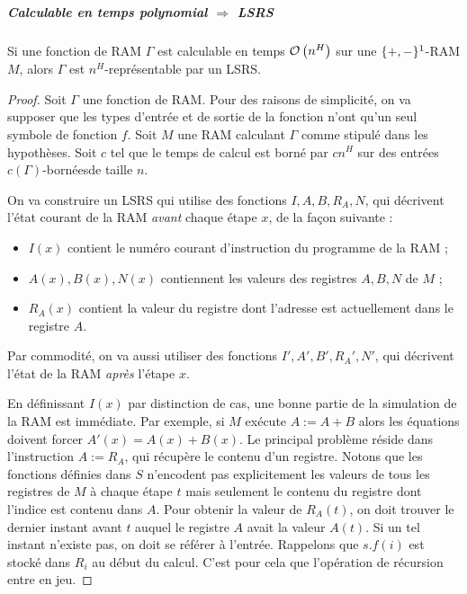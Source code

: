 \documentclass{article}
\begin{document}
		\pagebreak
		
	\subparagraph{Calculable en temps polynomial $\Rightarrow$ LSRS}
		
		
		\begin{conj}
			Si une fonction de RAM $\Gamma$ est calculable en temps $\mathcal{O}\left( n^H  \right)$ sur une $\{+, -\} \footnotemark$-RAM $M$, alors $\Gamma$ est $n^H$-représentable par un LSRS.
		
		\end{conj}
		
		\begin{proof}
			Soit $\Gamma$ une fonction de RAM. Pour des raisons de simplicité, on va supposer que les types d'entrée et de sortie de la fonction n'ont qu'un seul symbole de fonction $f$. Soit $M$ une RAM calculant $\Gamma$ comme stipulé dans les hypothèses. Soit $c$ tel que le temps de calcul est borné par $c n^H$ sur des entrées $c(\Gamma)$-bornées\footnotemark de taille $n$.
			
				
			On va construire un LSRS qui utilise des fonctions $I, A, B, R_A, N$, qui décrivent l'état courant de la RAM \emph{avant} chaque étape $x$, de la façon suivante :
			
			\begin{itemize}[itemsep=-1mm]
				\item	$I(x)$ contient le numéro courant d'instruction du programme de la RAM ;
				\item 	$A(x), B(x), N(x)$ contiennent les valeurs des registres $A, B, N$ de $M$ ;
				\item 	$R_A(x)$ contient la valeur du registre dont l'adresse est actuellement dans le registre $A$.
			\end{itemize}
			
			Par commodité, on va aussi utiliser des fonctions $I', A', B', R_A', N'$, qui décrivent l'état de la RAM \emph{après} l'étape $x$. 
			
			En définissant $I(x)$ par distinction de cas, une bonne partie de la simulation de la RAM est immédiate. Par exemple, si $M$ exécute $A:= A + B$ alors les équations doivent forcer $A'(x) = A(x) + B(x)$. Le principal problème réside dans l'instruction $A:= R_A$, qui récupère le contenu d'un registre. Notons que les fonctions définies dans $S$ n'encodent pas explicitement les valeurs de tous les registres de $M$ à chaque étape $t$ mais seulement le contenu du registre dont l'indice est contenu dans $A$. Pour obtenir la valeur de $R_A(t)$, on doit trouver le dernier instant avant $t$ auquel le registre $A$ avait la valeur $A(t)$. Si un tel instant n'existe pas, on doit se référer à l'entrée. Rappelons que $s.f(i)$ est stocké dans $R_i$ au début du calcul. C'est pour cela que l'opération de récursion entre en jeu\footnotemark.
			

\end{proof}
\end{document}

